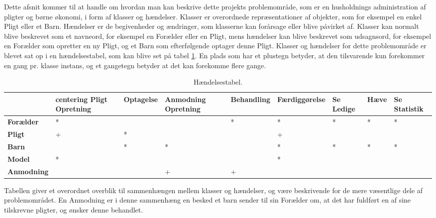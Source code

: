 Dette afsnit kommer til at handle om hvordan man kan beskrive dette projekts problemområde, som er en husholdnings administration af pligter og børne økonomi, i form af klasser og hændelser. Klasser er overordnede repræsentationer af objekter, som for eksempel en enkel Pligt eller et Barn. Hændelser er de begivenheder og ændringer, som klasserne kan forårsage eller blive påvirket af. Klasser kan normalt blive beskrevet som et navneord, for eksempel en Forælder eller en Pligt, mens hændelser kan blive beskrevet som udsagnsord, for eksempel en Forælder som opretter en ny Pligt, og et Barn som efterfølgende optager denne Pligt. Klasser og hændelser for dette problemområde er blevet sat op i en hændelsestabel, som kan blive set på tabel \ref{Haendelstabel}. En plads som har et plustegn betyder, at den tilsvarende kun forekommer en gang pr. klasse instans, og et gangetegn betyder at det kan forekomme flere gange.

\begin{table}[H]
	\begin{tabular}{| >{\centering\arraybackslash}m{1in} | >{\centering\arraybackslash}m{1in} | >{\centering\arraybackslash}m{1in} | >{\centering\arraybackslash}m{1in} | >{\centering\arraybackslash}m{1in} | >{\centering\arraybackslash}m{1in} | >{\centering\arraybackslash}m{1in} | >{\centering\arraybackslash}m{1in} | >{\centering\arraybackslash}m{1in} |}
	\hline
	& \textbf{centering Pligt Opretning} & \textbf{Optagelse} & 
	\textbf{Anmodning Opretning} & \textbf{Behandling} & 
	\textbf{Færdiggørelse} & \textbf{Se Ledige} & 
	\textbf{Hæve} & \textbf{Se Statistik} \\ \hline
	\textbf{Forælder} & * &  &  & * & * & * & * & * \\ \hline
	\textbf{Pligt} & + & * &  &  & + &  &  &  \\ \hline
	\textbf{Barn} &   & * & * &  & * & * & * & * \\ \hline
	\textbf{Model} & * &  &  &  & * &  &  &  \\ \hline
	\textbf{Anmodning} &  &  & + & + &  &  &  &  \\ \hline
	\end{tabular}
	\caption{Hændelsestabel.}
	\label{Haendelstabel}
\end{table}

Tabellen giver et overordnet overblik til sammenhængen mellem klasser og hændelser, og være beskrivende for de mere væsentlige dele af problemområdet. En Anmodning er i denne sammenhæng en besked et barn sender til sin Forælder om, at det har fuldført en af sine tilskrevne pligter, og ønsker denne behandlet.

